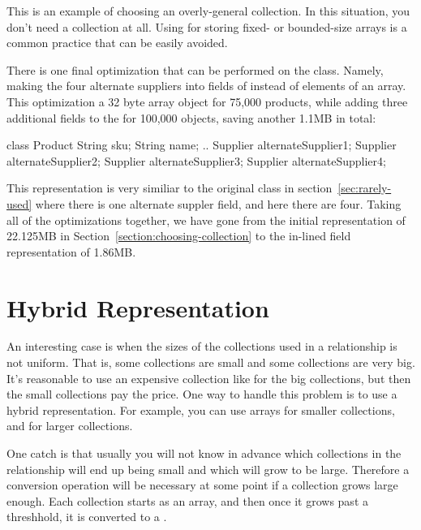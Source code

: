 This is an example of choosing an overly-general collection. In
this situation, you don't need a collection at all. Using 
for storing fixed- or bounded-size arrays is a
common practice that can be easily avoided.

There is one final optimization that can be performed on the 
class. Namely, making the four alternate suppliers into fields of
 instead of elements of an array. This optimization
 a 32 byte array object for 75,000 products, while adding three additional
 fields to the  for 100,000 objects, saving another 1.1MB in
 total:
\begin{shortlisting}
class Product {
	String sku;
	String name;
	.. 
	Supplier alternateSupplier1;
	Supplier alternateSupplier2;
	Supplier alternateSupplier3;
	Supplier alternateSupplier4;
}
\end{shortlisting}

This representation is very similiar to the original  class in
section~\ref{sec:rarely-used} where there is one alternate suppler field, and
here there are four. Taking all of the optimizations 
together, we have gone from the initial  representation
of 22.125MB in Section~\ref{section:choosing-collection} to the in-lined field
representation of 1.86MB. 

\section{Hybrid Representation}

An interesting case is when the sizes of the collections used in a relationship
is not uniform. That is, some collections are small and some collections are
very big.  It's reasonable to use an expensive collection like 
for the big collections, but then the small collections pay the price. One way
to handle this problem is to use a hybrid representation. For example, you can
use arrays for smaller collections, and  for larger
collections. 

One catch is that usually you will not know in advance which collections in the
relationship will end up being small and which will grow to be large. Therefore
a conversion operation will be necessary at some point if a collection grows
large enough. Each collection starts as an array, and then once it
grows past a threshhold, it is converted to a .

